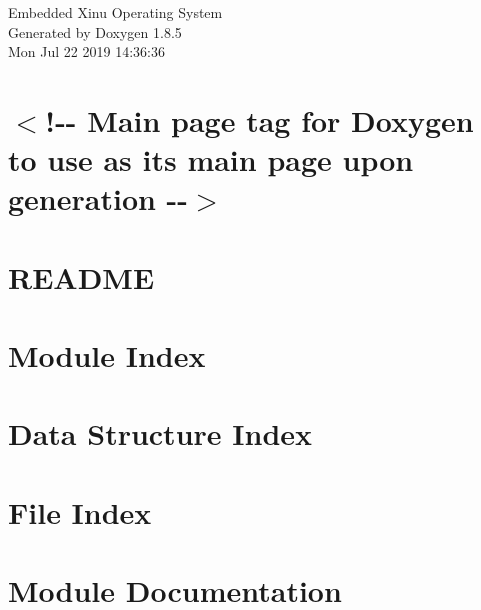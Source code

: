 \documentclass[twoside]{book}
\newcommand{\clearemptydoublepage}{%
  \newpage{\pagestyle{empty}\cleardoublepage}%
}
\begin{document}
\hypersetup{pageanchor=false}
\begin{titlepage}
\vspace*{7cm}
\begin{center}%
{\Large Embedded Xinu Operating System }\\
\vspace*{1cm}
{\large Generated by Doxygen 1.8.5}\\
\vspace*{0.5cm}
{\small Mon Jul 22 2019 14:36:36}\\
\end{center}
\end{titlepage}
\clearemptydoublepage
\tableofcontents
\clearemptydoublepage
{}
\hypersetup{pageanchor=true}

\chapter{$<$!-\/-\/ Main page tag for Doxygen to use as its main page upon generation -\/-\/$>$}
\label{index}\hypertarget{index}{}
\chapter{R\-E\-A\-D\-M\-E}
\label{md_README}
\hypertarget{md_README}{}

\chapter{Module Index}

\chapter{Data Structure Index}

\chapter{File Index}

\chapter{Module Documentation}







































\end{document}
